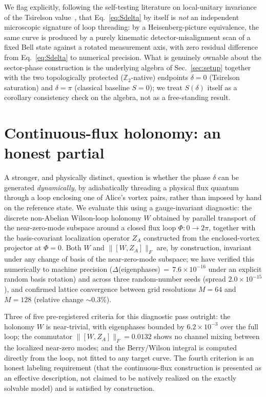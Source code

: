 \documentclass[aps,pra,twocolumn,superscriptaddress,floatfix,nofootinbib]{revtex4-2}
\begin{document}
We flag explicitly, following the self-testing literature on
local-unitary invariance of the Tsirelson
value~\cite{SupicBowles2020}, that Eq.~\eqref{eq:Sdelta} by itself is
\emph{not} an independent microscopic signature of loop threading: by
a Heisenberg-picture equivalence, the same curve is produced by a
purely kinematic detector-misalignment scan of a fixed Bell state
against a rotated measurement axis, with zero residual difference from
Eq.~\eqref{eq:Sdelta} to numerical precision. What is genuinely ownable
about the sector-phase construction is the underlying algebra of
Sec.~\ref{sec:setup} together with the two topologically protected
($\mathbb{Z}_2$-native) endpoints $\delta=0$ (Tsirelson saturation) and
$\delta=\pi$ (classical baseline $S=0$); we treat $S(\delta)$ itself as
a corollary consistency check on the algebra, not as a free-standing
result.

\section{Continuous-flux holonomy: an honest partial}
\label{sec:m5flux}

A stronger, and physically distinct, question is whether the phase
$\delta$ can be generated \emph{dynamically}, by adiabatically
threading a physical flux quantum through a loop enclosing one of
Alice's vortex pairs, rather than imposed by hand on the reference
state. We evaluate this using a gauge-invariant diagnostic: the
discrete non-Abelian Wilson-loop holonomy $W$ obtained by parallel
transport of the near-zero-mode subspace around a closed flux loop
$\Phi:0\to2\pi$, together with the basis-covariant localization
operator $Z_A$ constructed from the enclosed-vortex projector at
$\Phi=0$. Both $W$ and $\lVert[W,Z_A]\rVert_F$ are, by construction,
invariant under any change of basis of the near-zero-mode subspace; we
have verified this numerically to machine precision
($\Delta$(eigenphases)$\,{=}\,7.6\times10^{-16}$ under an explicit
random basis rotation) and across three random-number seeds
(spread $2.0\times10^{-15}$), and confirmed lattice convergence between
grid resolutions $M=64$ and $M=128$ (relative change $\sim0.3\%$).

Three of five pre-registered criteria for this diagnostic pass
outright: the holonomy $W$ is near-trivial, with eigenphases bounded
by $6.2\times10^{-3}$ over the full loop; the commutator
$\lVert[W,Z_A]\rVert_F=0.0132$ shows no channel mixing between the
localized near-zero modes; and the Berry/Wilson integral is computed
directly from the loop, not fitted to any target curve. The fourth
criterion is an honest labeling requirement (that the continuous-flux
construction is presented as an effective description, not claimed to
be natively realized on the exactly solvable model) and is satisfied
by construction.
\end{document}
